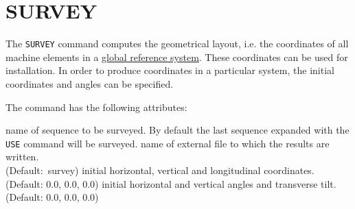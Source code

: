  
\chapter{SURVEY}
\label{chap:survey}

The \texttt{SURVEY} command computes the geometrical layout, i.e. the
coordinates of all machine elements in a 
\href{../Introduction/conventions.html}{global reference system}. These
coordinates can be used for installation. In order to produce
coordinates in a particular system, the initial coordinates and angles
can be specified. 


The command has the following attributes:
\begin{madlist}
     name of sequence to be surveyed. By default the
  last sequence expanded with the \texttt{USE} command will be surveyed.  
     name of external file to which the results are
  written.\\ (Default:~survey)
   initial horizontal, vertical and longitudinal
  coordinates.\\ (Default: 0.0, 0.0, 0.0) 
   initial horizontal and vertical angles and
  transverse tilt.\\ (Default: 0.0, 0.0, 0.0)
\end{madlist}


